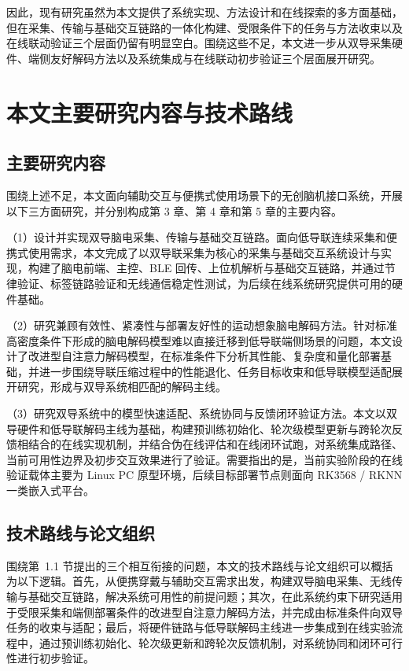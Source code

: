 因此，现有研究虽然为本文提供了系统实现、方法设计和在线探索的多方面基础，但在采集、传输与基础交互链路的一体化构建、受限条件下的任务与方法收束以及在线联动验证三个层面仍留有明显空白。围绕这些不足，本文进一步从双导采集硬件、端侧友好解码方法以及系统集成与在线联动初步验证三个层面展开研究。

\section{本文主要研究内容与技术路线}

\subsection{主要研究内容}

围绕上述不足，本文面向辅助交互与便携式使用场景下的无创脑机接口系统，开展以下三方面研究，并分别构成第 3 章、第 4 章和第 5 章的主要内容。

（1）设计并实现双导脑电采集、传输与基础交互链路。面向低导联连续采集和便携式使用需求，本文完成了以双导联采集为核心的采集与基础交互系统设计与实现，构建了脑电前端、主控、BLE 回传、上位机解析与基础交互链路，并通过节律验证、标签链路验证和无线通信稳定性测试，为后续在线系统研究提供可用的硬件基础。

（2）研究兼顾有效性、紧凑性与部署友好性的运动想象脑电解码方法。针对标准高密度条件下形成的脑电解码模型难以直接迁移到低导联端侧场景的问题，本文设计了改进型自注意力解码模型，在标准条件下分析其性能、复杂度和量化部署基础，并进一步围绕导联压缩过程中的性能退化、任务目标收束和低导联模型适配展开研究，形成与双导系统相匹配的解码主线。

（3）研究双导系统中的模型快速适配、系统协同与反馈闭环验证方法。本文以双导硬件和低导联解码主线为基础，构建预训练初始化、轮次级模型更新与跨轮次反馈相结合的在线实现机制，并结合伪在线评估和在线闭环试跑，对系统集成路径、当前可用性边界及初步交互效果进行了验证。需要指出的是，当前实验阶段的在线验证载体主要为 Linux PC 原型环境，后续目标部署节点则面向 RK3568 / RKNN 一类嵌入式平台。

\subsection{技术路线与论文组织}

围绕第~1.1 节提出的三个相互衔接的问题，本文的技术路线与论文组织可以概括为以下逻辑。首先，从便携穿戴与辅助交互需求出发，构建双导脑电采集、无线传输与基础交互链路，解决系统可用性的前提问题；其次，在此系统约束下研究适用于受限采集和端侧部署条件的改进型自注意力解码方法，并完成由标准条件向双导任务的收束与适配；最后，将硬件链路与低导联解码主线进一步集成到在线实验流程中，通过预训练初始化、轮次级更新和跨轮次反馈机制，对系统协同和闭环可行性进行初步验证。

